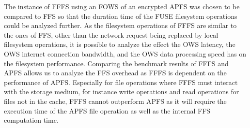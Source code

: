 The instance of FFFS using an FOWS of an encrypted APFS was chosen to be compared to FFS so that the duration time of the FUSE filesystem operations could be analyzed further. As the filesystem operations of FFFS are similar to the ones of FFS, other than the network request being replaced by local filesystem operations, it is possible to analyze the effect the OWS latency, the OWS internet connection bandwidth, and the OWS data processing speed has on the filesystem performance. 
Comparing the benchmark results of FFFS and APFS allows us to analyze the FFS overhead as FFFS is dependent on the performance of APFS. Especially for file operations where FFFS must interact with the storage medium, for instance write operations and read operations for files not in the cache, FFFS cannot outperform APFS as it will require the execution time of the APFS file operation as well as the internal FFS computation time.

